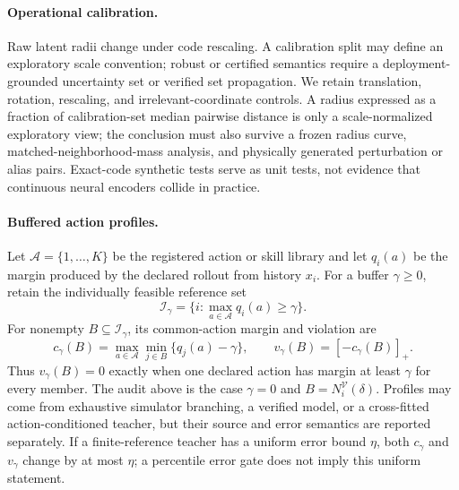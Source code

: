 \paragraph{Operational calibration.}
Raw latent radii change under code rescaling.  A calibration split may define an exploratory scale
convention; robust or certified semantics require a deployment-grounded uncertainty set or verified
set propagation.  We retain
translation, rotation, rescaling, and irrelevant-coordinate controls.  A radius expressed as a
fraction of calibration-set median pairwise distance is only a scale-normalized exploratory view;
the conclusion must also survive a frozen radius curve, matched-neighborhood-mass analysis, and
physically generated perturbation or alias pairs.  Exact-code synthetic tests serve as unit tests,
not evidence that continuous neural encoders collide in practice.

\paragraph{Buffered action profiles.}
Let $\mathcal A=\{1,\ldots,K\}$ be the registered action or skill library and let $q_i(a)$ be the
margin produced by the declared rollout from history $x_i$.  For a buffer $\gamma\geq0$, retain the
individually feasible reference set
\[
 \mathcal I_\gamma=\{i:\max_{a\in\mathcal A}q_i(a)\geq\gamma\}.
\]
For nonempty $B\subseteq\mathcal I_\gamma$, its common-action margin and violation are
\[
 c_\gamma(B)=\max_{a\in\mathcal A}\min_{j\in B}\{q_j(a)-\gamma\},
 \qquad
 v_\gamma(B)=[-c_\gamma(B)]_+.
\]
Thus $v_\gamma(B)=0$ exactly when one declared action has margin at least $\gamma$ for every member.
The audit above is the case $\gamma=0$ and $B=N_i^{\mathcal V}(\delta)$.  Profiles may come from exhaustive
simulator branching, a verified model, or a cross-fitted action-conditioned teacher, but their
source and error semantics are reported separately.  If a finite-reference teacher has a uniform
error bound $\eta$, both $c_\gamma$ and $v_\gamma$ change by at most $\eta$; a percentile error gate
does not imply this uniform statement.

